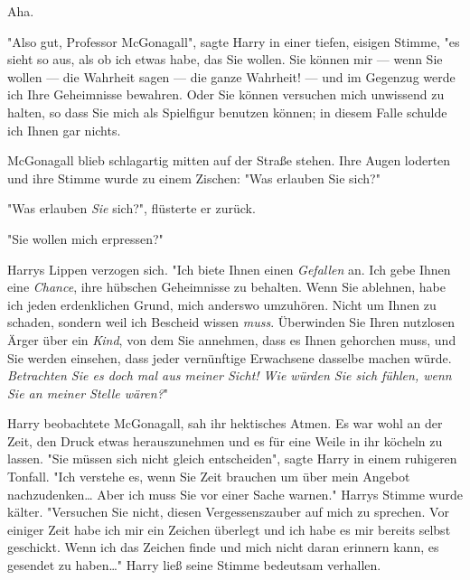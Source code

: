 {Aha.

"Also gut, Professor McGonagall", sagte Harry in einer tiefen, eisigen Stimme, "es sieht so aus, als ob ich etwas habe, das Sie wollen. Sie können mir --- wenn Sie wollen --- die Wahrheit sagen --- die ganze Wahrheit! --- und im Gegenzug werde ich Ihre Geheimnisse bewahren. Oder Sie können versuchen mich unwissend zu halten, so dass Sie mich als Spielfigur benutzen können; in diesem Falle schulde ich Ihnen gar nichts.

McGonagall blieb schlagartig mitten auf der Straße stehen. Ihre Augen loderten und ihre Stimme wurde zu einem Zischen: "Was erlauben Sie sich?"

"Was erlauben \emph{Sie} sich?", flüsterte er zurück.

"Sie wollen mich erpressen?"

Harrys Lippen verzogen sich. "Ich biete Ihnen einen \emph{Gefallen} an. Ich gebe Ihnen eine \emph{Chance}, ihre hübschen Geheimnisse zu behalten. Wenn Sie ablehnen, habe ich jeden erdenklichen Grund, mich anderswo umzuhören. Nicht um Ihnen zu schaden, sondern weil ich Bescheid wissen \emph{muss}. Überwinden Sie Ihren nutzlosen Ärger über ein \emph{Kind}, von dem Sie annehmen, dass es Ihnen gehorchen muss, und Sie werden einsehen, dass jeder vernünftige Erwachsene dasselbe machen würde. \emph{Betrachten Sie es doch mal aus meiner Sicht! Wie würden Sie sich fühlen, wenn Sie an meiner Stelle wären?}"

Harry beobachtete McGonagall, sah ihr hektisches Atmen. Es war wohl an der Zeit, den Druck etwas herauszunehmen und es für eine Weile in ihr köcheln zu lassen. "Sie müssen sich nicht gleich entscheiden", sagte Harry in einem ruhigeren Tonfall. "Ich verstehe es, wenn Sie Zeit brauchen um über mein Angebot nachzudenken… Aber ich muss Sie vor einer Sache warnen." Harrys Stimme wurde kälter. "Versuchen Sie nicht, diesen Vergessenszauber auf mich zu sprechen. Vor einiger Zeit habe ich mir ein Zeichen überlegt und ich habe es mir bereits selbst geschickt. Wenn ich das Zeichen finde und mich nicht daran erinnern kann, es gesendet zu haben…" Harry ließ seine Stimme bedeutsam verhallen.

}
